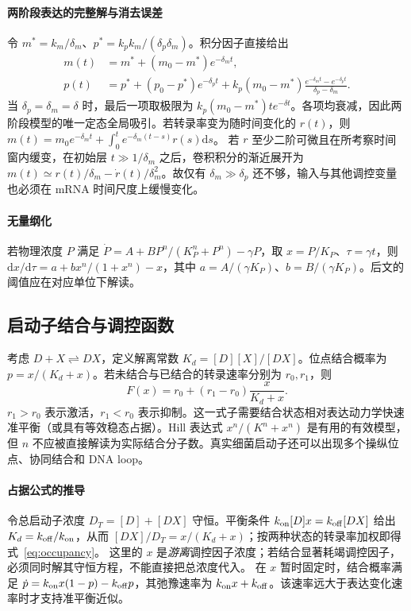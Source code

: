 \documentclass[11pt,a4paper,UTF8,fontset=fandol]{ctexart}
\newcommand{\dd}{\mathrm d}\newcommand{\R}{\mathbb R}\newcommand{\ssv}{\mathrm{ss}}
\begin{document}
\paragraph{两阶段表达的完整解与消去误差}
令 $m^*=k_m/\delta_m$、$p^*=k_pk_m/(\delta_p\delta_m)$。积分因子直接给出
\begin{align}
m(t)&=m^*+(m_0-m^*)e^{-\delta_mt},\\
p(t)&=p^*+(p_0-p^*)e^{-\delta_pt}
 +k_p(m_0-m^*)\frac{e^{-\delta_mt}-e^{-\delta_pt}}{\delta_p-\delta_m}.
\end{align}
当 $\delta_p=\delta_m=\delta$ 时，最后一项取极限为 $k_p(m_0-m^*)te^{-\delta t}$。各项均衰减，因此两阶段模型的唯一定态全局吸引。若转录率变为随时间变化的 $r(t)$，则
$m(t)=m_0e^{-\delta_mt}+\int_0^t e^{-\delta_m(t-s)}r(s)\dd s$。
若 $r$ 至少二阶可微且在所考察时间窗内缓变，在初始层 $t\gg1/\delta_m$ 之后，卷积积分的渐近展开为
$m(t)\simeq r(t)/\delta_m-\dot r(t)/\delta_m^2$。故仅有 $\delta_m\gg\delta_p$ 还不够，输入与其他调控变量也必须在 mRNA 时间尺度上缓慢变化。

\paragraph{无量纲化}
若物理浓度 $P$ 满足 $\dot P=A+B P^n/(K_P^n+P^n)-\gamma P$，取 $x=P/K_P$、$\tau=\gamma t$，则
$\dd x/\dd\tau=a+b x^n/(1+x^n)-x$，其中 $a=A/(\gamma K_P)$、$b=B/(\gamma K_P)$。后文的阈值应在对应单位下解读。


\subsection{启动子结合与调控函数}
考虑 $D+X\rightleftharpoons DX$，定义解离常数 $K_d=[D][X]/[DX]$。位点结合概率为 $p=x/(K_d+x)$。若未结合与已结合的转录速率分别为 $r_0,r_1$，则
\begin{equation}F(x)=r_0+(r_1-r_0)\frac{x}{K_d+x}.\label{eq:occupancy}\end{equation}
$r_1>r_0$ 表示激活，$r_1<r_0$ 表示抑制。这一式子需要结合状态相对表达动力学快速准平衡（或具有等效稳态占据）。Hill 表达式 $x^n/(K^n+x^n)$ 是有用的有效模型，但 $n$ 不应被直接解读为实际结合分子数。真实细菌启动子还可以出现多个操纵位点、协同结合和 DNA loop。


\paragraph{占据公式的推导}
令总启动子浓度 $D_T=[D]+[DX]$ 守恒。平衡条件
$k_{\rm on}[D]x=k_{\rm off}[DX]$ 给出 $K_d=k_{\rm off}/k_{\rm on}$，从而
$[DX]/D_T=x/(K_d+x)$；按两种状态的转录率加权即得式~\eqref{eq:occupancy}。
这里的 $x$ 是\emph{游离}调控因子浓度；若结合显著耗竭调控因子，必须同时解其守恒方程，不能直接把总浓度代入。
在 $x$ 暂时固定时，结合概率满足
$\dot p=k_{\rm on}x(1-p)-k_{\rm off}p$，其弛豫速率为 $k_{\rm on}x+k_{\rm off}$。该速率远大于表达变化速率时才支持准平衡近似。
\end{document}
